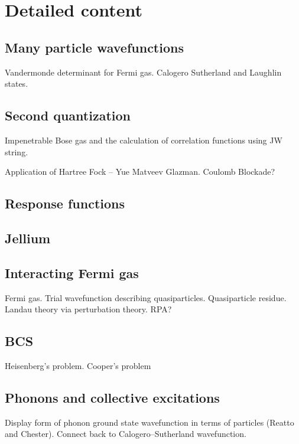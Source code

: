 \section{Detailed content}

\subsection{Many particle wavefunctions}

Vandermonde determinant for Fermi gas. Calogero Sutherland and Laughlin states.

\subsection{Second quantization}

Impenetrable Bose gas and the calculation of correlation functions using JW string.

Application of Hartree Fock -- Yue Matveev Glazman. Coulomb Blockade?

\subsection{Response functions}

\subsection{Jellium}


\subsection{Interacting Fermi gas}

Fermi gas. Trial wavefunction describing quasiparticles. Quasiparticle residue. Landau theory via perturbation theory. RPA?

\subsection{BCS}

Heisenberg's problem. Cooper's problem
\subsection{Phonons and collective excitations}

Display form of phonon ground state wavefunction in terms of particles (Reatto and Chester). Connect back to Calogero--Sutherland wavefunction. 

